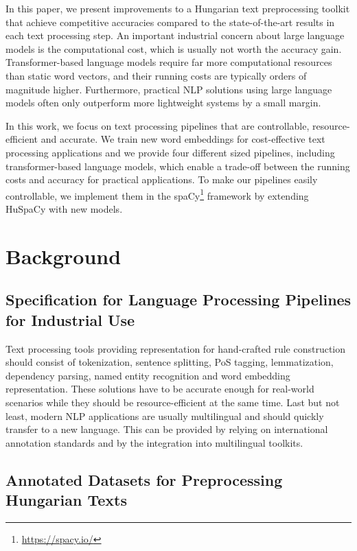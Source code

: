 \documentclass[runningheads,a4paper]{llncs}
\newcommand{\spacy}{spaCy}
\newcommand{\huspacy}{HuSpaCy}
\begin{document}
In this paper, we present improvements to a Hungarian text preprocessing toolkit that achieve competitive accuracies compared to the state-of-the-art results in each text processing step. An important industrial concern about large language models is the computational cost, which is usually not worth the accuracy gain. Transformer-based language models require far more computational resources than static word vectors, and their running costs are typically orders of magnitude higher. Furthermore, practical NLP solutions using large language models often only outperform more lightweight systems by a small margin.

In this work, we focus on text processing pipelines that are controllable, resource-efficient and accurate. We train new word embeddings for cost-effective text processing applications and we provide four different sized pipelines, including transformer-based language models, which enable a trade-off between the running costs and accuracy for practical applications. To make our pipelines easily controllable, we implement them in the \spacy\footnote{\url{https://spacy.io/}} framework \cite{spacy} by extending \huspacy{} \cite{huspacy:2021} with new models. 

\section{Background} \label{sec:background}
\subsection{Specification for Language Processing Pipelines for Industrial Use} \label{sec:background:specification}

Text processing tools providing representation for hand-crafted rule construction should consist of tokenization, sentence splitting, PoS tagging, lemmatization, dependency parsing, named entity recognition and word embedding representation. These solutions have to be accurate enough for real-world scenarios while they should be resource-efficient at the same time. Last but not least, modern NLP applications are usually multilingual and should quickly transfer to a new language. This can be provided by relying on international annotation standards and by the integration into multilingual toolkits. 

\subsection{Annotated Datasets for Preprocessing Hungarian Texts} \label{sec:background:datasets}
\end{document}
